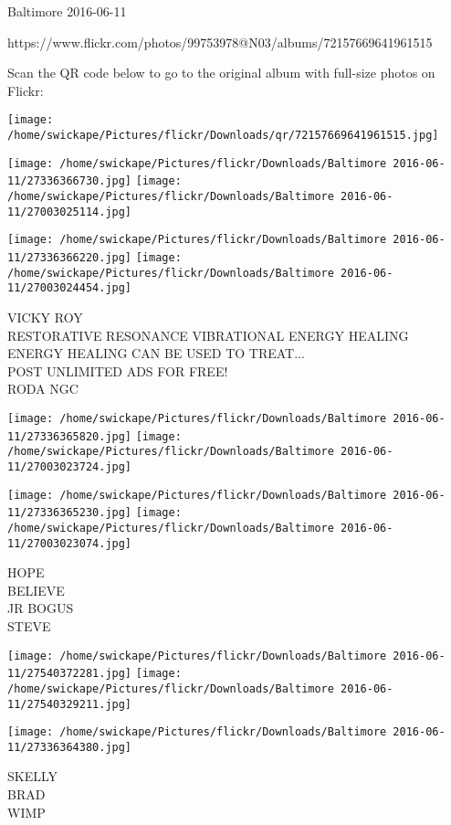 \documentclass[10pt,letterpaper]{article}
\begin{document}
Baltimore 2016-06-11

https://www.flickr.com/photos/99753978@N03/albums/72157669641961515

Scan the QR code below to go to the original album with full-size photos on Flickr:

\texttt{[image: /home/swickape/Pictures/flickr/Downloads/qr/72157669641961515.jpg]}
\pagebreak

\texttt{[image: /home/swickape/Pictures/flickr/Downloads/Baltimore 2016-06-11/27336366730.jpg]}
\texttt{[image: /home/swickape/Pictures/flickr/Downloads/Baltimore 2016-06-11/27003025114.jpg]}

\texttt{[image: /home/swickape/Pictures/flickr/Downloads/Baltimore 2016-06-11/27336366220.jpg]}
\texttt{[image: /home/swickape/Pictures/flickr/Downloads/Baltimore 2016-06-11/27003024454.jpg]}

VICKY ROY\\
RESTORATIVE RESONANCE VIBRATIONAL ENERGY HEALING ENERGY HEALING CAN BE USED TO TREAT...\\
POST UNLIMITED ADS FOR FREE!\\
RODA NGC\\
\pagebreak

\texttt{[image: /home/swickape/Pictures/flickr/Downloads/Baltimore 2016-06-11/27336365820.jpg]}
\texttt{[image: /home/swickape/Pictures/flickr/Downloads/Baltimore 2016-06-11/27003023724.jpg]}

\texttt{[image: /home/swickape/Pictures/flickr/Downloads/Baltimore 2016-06-11/27336365230.jpg]}
\texttt{[image: /home/swickape/Pictures/flickr/Downloads/Baltimore 2016-06-11/27003023074.jpg]}

HOPE\\
BELIEVE\\
JR BOGUS\\
STEVE\\
\pagebreak

\texttt{[image: /home/swickape/Pictures/flickr/Downloads/Baltimore 2016-06-11/27540372281.jpg]}
\texttt{[image: /home/swickape/Pictures/flickr/Downloads/Baltimore 2016-06-11/27540329211.jpg]}

\texttt{[image: /home/swickape/Pictures/flickr/Downloads/Baltimore 2016-06-11/27336364380.jpg]}

SKELLY\\
BRAD\\
WIMP\\
\pagebreak
\end{document}
